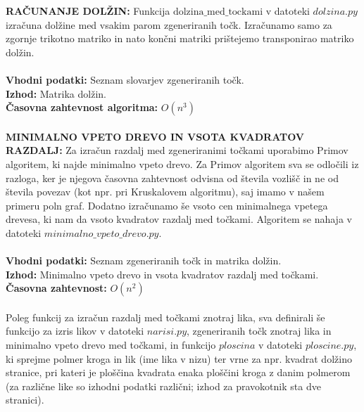 \documentclass[a4paper]{report}
\begin{document}
\textbf{RAČUNANJE DOLŽIN: } Funkcija $\text{dolzina\_med\_tockami}$ v datoteki \colorbox{gray!10}{$dolzina.py$} izračuna dolžine med vsakim parom zgeneriranih točk. Izračunamo samo za zgornje trikotno matriko in nato končni matriki prištejemo transponirao matriko dolžin.\\ \\
\textbf{Vhodni podatki: } Seznam slovarjev zgeneriranih točk. \\
\textbf{Izhod:} Matrika dolžin. \\
\textbf{Časovna zahtevnost algoritma:} $O(n^3)$\\ \\
\textbf{MINIMALNO VPETO DREVO IN VSOTA KVADRATOV RAZDALJ: } Za izračun razdalj med zgeneriranimi točkami uporabimo Primov algoritem, ki najde minimalno vpeto drevo. Za Primov algoritem sva se odločili iz razloga, ker je njegova časovna zahtevnost odvisna od števila vozlišč in ne od števila povezav (kot npr. pri Kruskalovem algoritmu), saj imamo v našem primeru poln graf. Dodatno izračunamo še vsoto cen minimalnega vpetega drevesa, ki nam da vsoto kvadratov razdalj med točkami. Algoritem se nahaja v datoteki \colorbox{gray!10}{$minimalno\_vpeto\_drevo.py$}. \\ \\
\textbf{Vhodni podatki:} Seznam zgeneriranih točk in matrika dolžin. \\ 
\textbf{Izhod: } Minimalno vpeto drevo in vsota kvadratov razdalj med točkami. \\
\textbf{Časovna zahtevnost: } $O(n^2)$\\ \\
Poleg funkcij za izračun razdalj med točkami znotraj lika, sva definirali še funkcijo za izris likov v datoteki \colorbox{gray!10}{$narisi.py$}, zgeneriranih točk znotraj lika in minimalno vpeto drevo med točkami, in funkcijo $ploscina$ v datoteki \colorbox{gray!10}{$ploscine.py$}, ki sprejme polmer kroga in lik (ime lika v nizu) ter vrne za npr. kvadrat dolžino stranice, pri kateri je ploščina kvadrata enaka ploščini kroga z danim polmerom (za različne like so izhodni podatki različni; izhod za pravokotnik sta dve stranici). \\ \\
\end{document}
